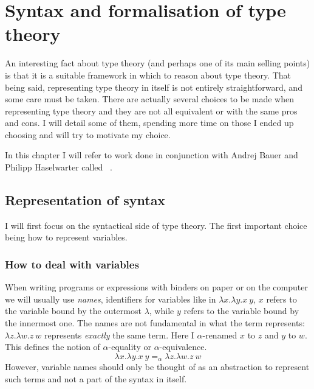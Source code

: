 \chapter{Syntax and formalisation of type theory}

An interesting fact about type theory (and perhaps one of its main selling
points) is that it is a suitable framework in which to reason about type theory.
That being said, representing type theory in itself is not entirely
straightforward, and some care must be taken. There are actually several choices
to be made when representing type theory and they are not all equivalent or with
the same pros and cons.
I will detail some of them, spending more time on those I ended up choosing
and will try to motivate my choice.

In this chapter I will refer to work done in conjunction with Andrej Bauer and
Philipp Haselwarter called \ftt~.

\section{Representation of syntax}

I will first focus on the syntactical side of type theory.
The first important choice being how to represent variables.

\subsection{How to deal with variables}

When writing programs or expressions with binders on paper or on the computer
we will usually use \emph{names}, identifiers for variables like in
\(\lambda x. \lambda y. x\ y\), \(x\) refers to the variable bound by the
outermost \(\lambda\), while \(y\) refers to the variable bound by the
innermost one.
The names are not fundamental in what the term represents:
\(\lambda z. \lambda w. z\ w\) represents \emph{exactly} the same term.
Here I \(\alpha\)-renamed \(x\)
to \(z\) and \(y\) to \(w\). This defines the notion of \(\alpha\)-equality
or \(\alpha\)-equivalence.
\[
  \lambda x. \lambda y. x\ y =_\alpha \lambda z. \lambda w. z\ w
\]
However, variable names should only be thought of as an abstraction to represent
such terms and not a part of the syntax in itself.

